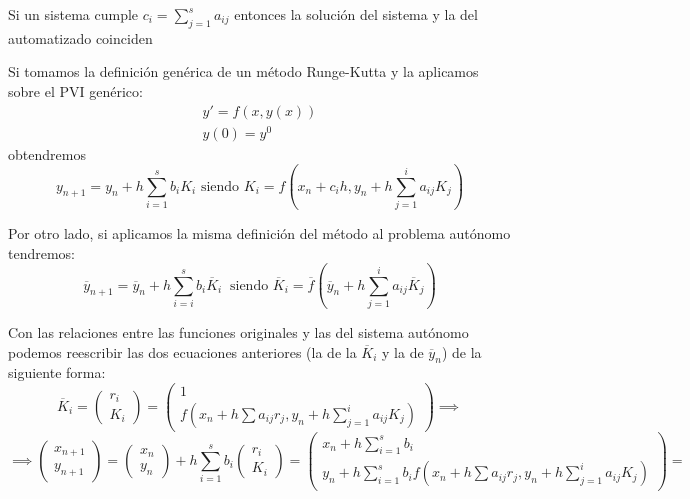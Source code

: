 \begin{problem}Si un sistema cumple $c_i = \sum_{j=1}^sa_{ij}$ entonces la solución del sistema y la del automatizado coinciden

\solution


Si tomamos la definición genérica de un método Runge-Kutta y la aplicamos sobre el PVI genérico:
\[\begin{array}{l}
y'=f(x,y(x))\\
y(0)=y^0
\end{array}\]
obtendremos
\[y_{n+1} = y_n+ h \sum_{i=1}^s b_i K_i \text{ siendo } K_i = f\left(x_n+c_ih, y_n+h \sum_{j=1}^ia_{ij}K_j\right)\]

Por otro lado, si aplicamos la misma definición del método al problema autónomo tendremos:
\[\overline{y}_{n+1}=\overline{y}_n+h\sum_{i=i}^sb_i\overline{K}_i\ \text{ siendo } \overline{K}_i = \overline{f}\left(\overline{y}_n+h\sum_{j=1}^ia_{ij}\overline{K}_j\right)\]

Con las relaciones entre las funciones originales y las del sistema autónomo podemos reescribir las dos ecuaciones anteriores (la de la $\overline{K}_i$ y la de $\overline{y}_n$) de la siguiente forma:
\small
\[\overline{K}_i = \left( \begin{array}{c} r_i \\ K_i \end{array}\right) = \left(\begin{array}{c} 1 \\ f\left(x_n+h\sum a_{ij}r_j, y_n+h \sum_{j=1}^ia_{ij}K_j\right)\end{array}\right) \implies \]
\[\implies \left( \begin{array}{c} x_{n+1} \\ y_{n+1}\end{array}\right) = \left( \begin{array}{c} x_n \\ y_n\end{array}\right) + h\sum_{i=1}^sb_i\left( \begin{array}{c} r_i \\ K_i\end{array}\right)=  \left(\begin{array}{c} x_n+h\sum_{i=1}^sb_i \\ y_n+h\sum_{i=1}^sb_if\left(x_n+h\sum a_{ij}r_j, y_n+h \sum_{j=1}^ia_{ij}K_j\right)\end{array}\right)=\]
\normalsize


\end{problem}
